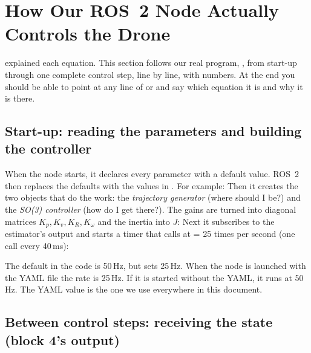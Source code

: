 \section{How Our ROS~2 Node Actually Controls the Drone}
\label{sec:realctrl}

 explained each equation. This section follows our real program, ,
from start-up through one complete control step, line by line, with numbers. At the end you should be able to point
at any line of  or  and say which equation it is and why it is there.

\subsection{Start-up: reading the parameters and building the controller}

When the node starts, it declares every parameter with a default value. ROS~2 then replaces the defaults with the
values in . For example:
Then it creates the two objects that do the work: the \emph{trajectory generator} (where should I be?) and the
\emph{SO(3) controller} (how do I get there?). The gains are turned into diagonal matrices $K_p,K_v,K_R,K_\omega$ and the
inertia into $J$:
Next it subscribes to the estimator's output and starts a timer that calls  at
 = 25 times per second (one call every 40\,ms):

\begin{warn}
The default  in the code is 50\,Hz, but  sets 25\,Hz. When the node is launched
with the YAML file the rate is 25\,Hz. If it is started without the YAML, it runs at 50\,Hz. The YAML value is the one
we use everywhere in this document.
\end{warn}

\subsection{Between control steps: receiving the state (block 4's output)}

